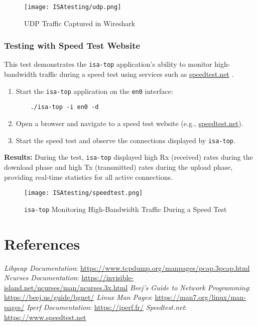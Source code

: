 \documentclass[12pt]{extarticle}
\begin{document}
\begin{figure}[H]
    \centering
    \texttt{[image: ISAtesting/udp.png]}
    \caption{UDP Traffic Captured in Wireshark}
\end{figure}

\subsubsection{Testing with Speed Test Website}

This test demonstrates the \texttt{isa-top} application’s ability to monitor high-bandwidth traffic during a speed test using services such as \href{https://www.speedtest.net}{speedtest.net} \cite{speedtest}.

\begin{enumerate}
    \item Start the \texttt{isa-top} application on the \texttt{en0} interface:
    \begin{verbatim}
    ./isa-top -i en0 -d
    \end{verbatim}
    \item Open a browser and navigate to a speed test website (e.g., \href{https://www.speedtest.net}{speedtest.net}).
    \item Start the speed test and observe the connections displayed by \texttt{isa-top}.
\end{enumerate}

\textbf{Results:} During the test, \texttt{isa-top} displayed high Rx (received) rates during the download phase and high Tx (transmitted) rates during the upload phase, providing real-time statistics for all active connections.

\begin{figure}[H]
    \centering
    \texttt{[image: ISAtesting/speedtest.png]}
    \caption{\texttt{isa-top} Monitoring High-Bandwidth Traffic During a Speed Test}
\end{figure}

\section{References}
\begin{thebibliography}{9}
     \textit{Libpcap Documentation}: \url{https://www.tcpdump.org/manpages/pcap.3pcap.html}
     \textit{Ncurses Documentation}: \url{https://invisible-island.net/ncurses/man/ncurses.3x.html}
     \textit{Beej's Guide to Network Programming}: \url{https://beej.us/guide/bgnet/}
     \textit{Linux Man Pages}: \url{https://man7.org/linux/man-pages/}
     \textit{Iperf Documentation}: \url{https://iperf.fr/}
     \textit{Speedtest.net}: \url{https://www.speedtest.net}
\end{thebibliography}
\end{document}
